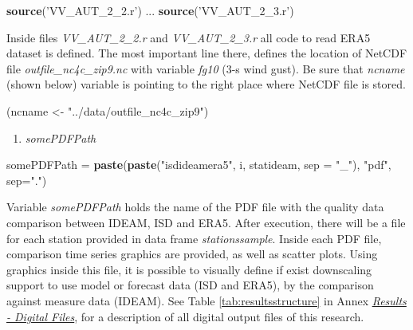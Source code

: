 \documentclass[12pt,oneside]{reedthesis}
\newenvironment{Shaded}{\begin{snugshade}}{\end{snugshade}}
\newcommand{\DataTypeTok}[1]{\textcolor[rgb]{0.13,0.29,0.53}{#1}}
\newcommand{\KeywordTok}[1]{\textcolor[rgb]{0.13,0.29,0.53}{\textbf{#1}}}
\newcommand{\NormalTok}[1]{#1}
\newcommand{\StringTok}[1]{\textcolor[rgb]{0.31,0.60,0.02}{#1}}
\providecommand{\tightlist}{%
  \setlength{\itemsep}{0pt}\setlength{\parskip}{0pt}}
\begin{document}
\vspace{0.4cm}
\begin{Shaded}
\begin{Highlighting}[]
      \KeywordTok{source}\NormalTok{(}\StringTok{'VV_AUT_2_2.r'}\NormalTok{)}
\NormalTok{      ...}
      \KeywordTok{source}\NormalTok{(}\StringTok{'VV_AUT_2_3.r'}\NormalTok{)}
\end{Highlighting}
\end{Shaded}
\normalsize

Inside files \emph{VV\_AUT\_2\_2.r} and \emph{VV\_AUT\_2\_3.r} all code to read ERA5 dataset is defined. The most important line there, defines the location of NetCDF file \emph{outfile\_nc4c\_zip9.nc} with variable \emph{fg10} (3-s wind gust). Be sure that \emph{ncname} (shown below) variable is pointing to the right place where NetCDF file is stored.

\scriptsize

\vspace{0.4cm}
\begin{Shaded}
\begin{Highlighting}[]
\NormalTok{      (ncname <-}\StringTok{ "../data/outfile_nc4c_zip9"}\NormalTok{)}
\end{Highlighting}
\end{Shaded}
\normalsize
\begin{enumerate}
\def\labelenumi{\arabic{enumi}.}
\setcounter{enumi}{4}
\tightlist
\item
  \emph{somePDFPath}
\end{enumerate}
\scriptsize

\vspace{0.4cm}
\begin{Shaded}
\begin{Highlighting}[]
\NormalTok{      somePDFPath =}\StringTok{ }\KeywordTok{paste}\NormalTok{(}\KeywordTok{paste}\NormalTok{(}\StringTok{"isdideamera5"}\NormalTok{, i, statideam, }\DataTypeTok{sep =} \StringTok{"_"}\NormalTok{), }\StringTok{"pdf"}\NormalTok{, }\DataTypeTok{sep=}\StringTok{"."}\NormalTok{)}
\end{Highlighting}
\end{Shaded}
\normalsize

Variable \emph{somePDFPath} holds the name of the PDF file with the quality data comparison between IDEAM, ISD and ERA5. After execution, there will be a file for each station provided in data frame \emph{stationssample}. Inside each PDF file, comparison time series graphics are provided, as well as scatter plots. Using graphics inside this file, it is possible to visually define if exist downscaling support to use model or forecast data (ISD and ERA5), by the comparison against measure data (IDEAM). See Table \ref{tab:resultsstructure} in Annex \emph{\protect\hyperlink{results}{Results - Digital Files}}, for a description of all digital output files of this research.
\end{document}
